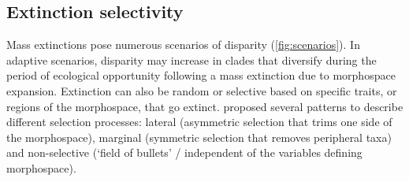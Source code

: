 \documentclass[titlepage]{article}
\begin{document}


\subsection{Extinction selectivity}
Mass extinctions pose numerous scenarios of disparity (\autoref{fig:scenarios}).
In adaptive scenarios, disparity may increase in clades that diversify during the period of ecological opportunity following a mass extinction due to morphospace expansion.
Extinction can also be random or selective based on specific traits, or regions of the morphospace, that go extinct.
\cite{korn_extinction_2013} proposed several patterns to describe different selection processes: lateral (asymmetric selection that trims one side of the morphospace), marginal (symmetric selection that removes peripheral taxa) and non-selective (`field of bullets' / independent of the variables defining morphospace). 
\end{document}
